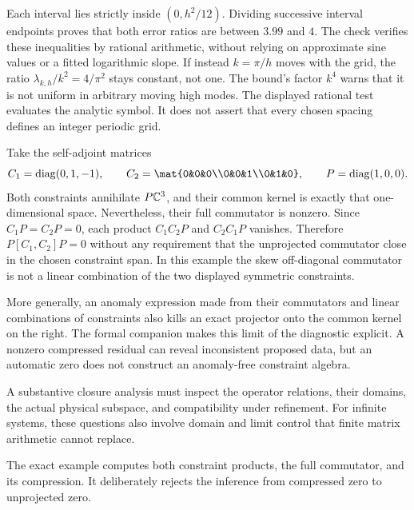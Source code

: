Each interval lies strictly inside $(0,h^2/12)$. Dividing successive interval endpoints proves that both error ratios are between $3.99$ and $4$. The check verifies these inequalities by rational arithmetic, without relying on approximate sine values or a fitted logarithmic slope.
If instead $k=\pi/h$ moves with the grid, the ratio $\lambda_{k,h}/k^2=4/\pi^2$ stays constant, not one. The bound's factor $k^4$ warns that it is not uniform in arbitrary moving high modes. The displayed rational test evaluates the analytic symbol. It does not assert that every chosen spacing defines an integer periodic grid.

Take the self-adjoint matrices
\[
C_1=\diag(0,1,-1),\qquad
C_2=\mat{0&0&0\\0&0&1\\0&1&0},\qquad
P=\diag(1,0,0).
\]
Both constraints annihilate $P\CC^3$, and their common kernel is exactly that one-dimensional space. Nevertheless, their full commutator is nonzero.
Since $C_1P=C_2P=0$, each product $C_1C_2P$ and $C_2C_1P$ vanishes. Therefore $P[C_1,C_2]P=0$ without any requirement that the unprojected commutator close in the chosen constraint span. In this example the skew off-diagonal commutator is not a linear combination of the two displayed symmetric constraints.

More generally, an anomaly expression made from their commutators and linear combinations of constraints also kills an exact projector onto the common kernel on the right. The formal companion makes this limit of the diagnostic explicit. A nonzero compressed residual can reveal inconsistent proposed data, but an automatic zero does not construct an anomaly-free constraint algebra.

A substantive closure analysis must inspect the operator relations, their domains, the actual physical subspace, and compatibility under refinement. For infinite systems, these questions also involve domain and limit control that finite matrix arithmetic cannot replace.

The exact example computes both constraint products, the full commutator, and its compression. It deliberately rejects the inference from compressed zero to unprojected zero.

